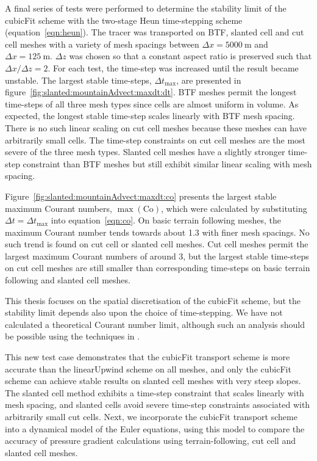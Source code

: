A final series of tests were performed to determine the stability limit of the cubicFit scheme with the two-stage Heun time-stepping scheme (equation~\ref{eqn:heun}).
The tracer was transported on BTF, slanted cell and cut cell meshes with a variety of mesh spacings between $\Delta x = \SI{5000}{\meter}$ and $\Delta x = \SI{125}{\meter}$.  $\Delta z$ was chosen so that a constant aspect ratio is preserved such that $\Delta x / \Delta z = 2$.
For each test, the time-step was increased until the result became unstable.  The largest stable time-steps, $\Delta t_\mathrm{max}$, are presented in figure~\ref{fig:slanted:mountainAdvect:maxdt:dt}.
BTF meshes permit the longest time-steps of all three mesh types since cells are almost uniform in volume.  As expected, the longest stable time-step scales linearly with BTF mesh spacing.
There is no such linear scaling on cut cell meshes because these meshes can have arbitrarily small cells.  The time-step constraints on cut cell meshes are the most severe of the three mesh types.  Slanted cell meshes have a slightly stronger time-step constraint than BTF meshes but still exhibit similar linear scaling with mesh spacing.  

Figure~\ref{fig:slanted:mountainAdvect:maxdt:co} presents the largest stable maximum Courant numbers, $\max(\mathrm{Co})$, which were calculated by substituting $\Delta t = \Delta t_\mathrm{max}$ into equation~\eqref{eqn:co}.
On basic terrain following meshes, the maximum Courant number tends towards about \num{1.3} with finer mesh spacings.
No such trend is found on cut cell or slanted cell meshes.
Cut cell meshes permit the largest maximum Courant numbers of around \num{3}, but the largest stable time-steps on cut cell meshes are still smaller than corresponding time-steps on basic terrain following and slanted cell meshes.

This thesis focuses on the spatial discretisation of the cubicFit scheme, but the stability limit depends also upon the choice of time-stepping.  We have not calculated a theoretical Courant number limit, although such an analysis should be possible using the techniques in \citep{baldauf2008}.

This new test case demonstrates that the cubicFit transport scheme is more accurate than the linearUpwind scheme on all meshes, and only the cubicFit scheme can achieve stable results on slanted cell meshes with very steep slopes.
The slanted cell method exhibits a time-step constraint that scales linearly with mesh spacing, and slanted cells avoid severe time-step constraints associated with arbitrarily small cut cells.
Next, we incorporate the cubicFit transport scheme into a dynamical model of the Euler equations, using this model to compare the accuracy of pressure gradient calculations using terrain-following, cut cell and slanted cell meshes.
